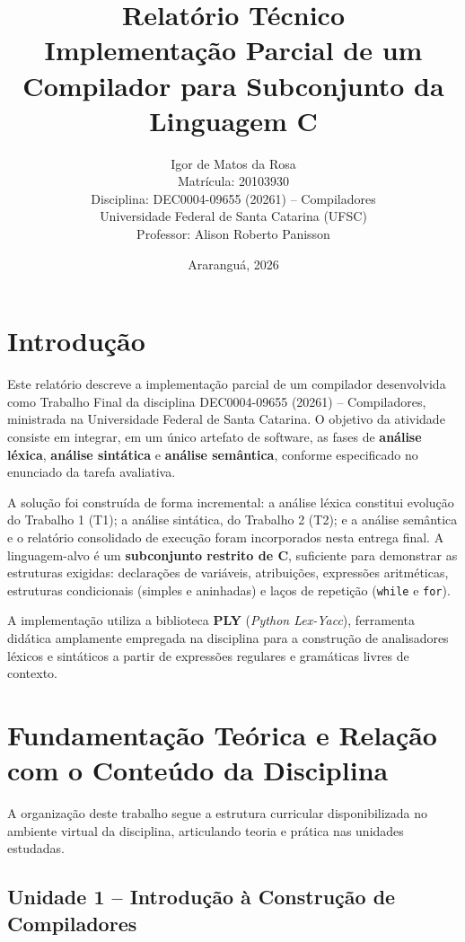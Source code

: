 \documentclass[12pt,a4paper]{article}
\title{%
  \textbf{Relatório Técnico}\\[0.4cm]
  \large Implementação Parcial de um Compilador para Subconjunto da Linguagem C
}
\author{%
  Igor de Matos da Rosa\\[0.2cm]
  \small Matrícula: 20103930\\[0.6cm]
  \small Disciplina: DEC0004-09655 (20261) -- Compiladores\\
  \small Universidade Federal de Santa Catarina (UFSC)\\[0.3cm]
  \small Professor: Alison Roberto Panisson
}
\date{Araranguá, 2026}
\begin{document}
\maketitle
\thispagestyle{empty}
\newpage

\tableofcontents
\newpage

\section{Introdução}

Este relatório descreve a implementação parcial de um compilador desenvolvida como
Trabalho Final da disciplina DEC0004-09655 (20261) -- Compiladores, ministrada na Universidade
Federal de Santa Catarina. O objetivo da atividade consiste em integrar, em um único
artefato de software, as fases de \textbf{análise léxica}, \textbf{análise sintática}
e \textbf{análise semântica}, conforme especificado no enunciado da tarefa avaliativa.

A solução foi construída de forma incremental: a análise léxica constitui evolução
do Trabalho 1 (T1); a análise sintática, do Trabalho 2 (T2); e a análise semântica
e o relatório consolidado de execução foram incorporados nesta entrega final. A
linguagem-alvo é um \textbf{subconjunto restrito de C}, suficiente para demonstrar
as estruturas exigidas: declarações de variáveis, atribuições, expressões aritméticas,
estruturas condicionais (simples e aninhadas) e laços de repetição (\texttt{while} e
\texttt{for}).

A implementação utiliza a biblioteca \textbf{PLY} (\textit{Python Lex-Yacc}), ferramenta
didática amplamente empregada na disciplina para a construção de analisadores léxicos
e sintáticos a partir de expressões regulares e gramáticas livres de contexto.

\section{Fundamentação Teórica e Relação com o Conteúdo da Disciplina}

A organização deste trabalho segue a estrutura curricular disponibilizada no ambiente
virtual da disciplina, articulando teoria e prática nas unidades estudadas.

\subsection{Unidade 1 -- Introdução à Construção de Compiladores}
\end{document}
